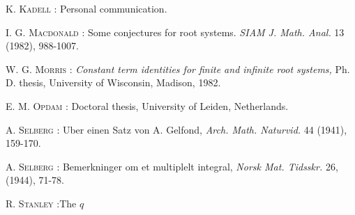 \begin{thebibliography}{99}
 \textsc{K. Kadell} : Personal communication.

 \textsc{I. G. Macdonald} :  Some conjectures for root systems. \textit{SIAM J.  Math. Anal.} 13 (1982), 988-1007.

 \textsc{W. G. Morris} : \textit{Constant term identities for finite and infinite root systems,} Ph. D. thesis, University of Wisconsin, Madison, 1982.

 \textsc{E. M. Opdam} : Doctoral thesis, University of Leiden, Netherlands.

 \textsc{A. Selberg} : Uber einen Satz von A. Gelfond, \textit{Arch. Math. Naturvid.} 44 (1941), 159-170.

 \textsc{A. Selberg} : Bemerkninger om et multiplelt integral, \textit{Norsk Mat. Tidsskr.} 26, (1944), 71-78.

 \textsc{R. Stanley} :\pageoriginale The $q$







\end{thebibliography}

